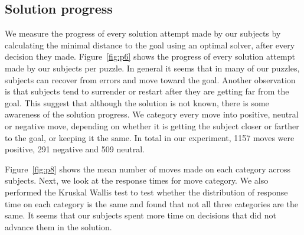 \documentclass[10pt,letterpaper]{article}
\begin{document}
\subsection{Solution progress}

We measure the progress of every solution attempt made by our subjects by calculating the minimal distance to the goal using an optimal solver, after every decision they made.  Figure~\ref{fig:p6} shows the progress of every solution attempt made by our subjects per puzzle. In general it seems that in many of our puzzles, subjects can recover from errors and move toward the goal. 
Another observation is that subjects tend to surrender or restart after they are getting far from the goal. This suggest that although the solution is not known, there is some awareness of the solution progress.
We category every move into positive, neutral or negative move, depending on whether it is getting the subject closer or farther to the goal, or keeping it the same. 
In total in our experiment, 1157 moves were positive, 291 negative and 509 neutral.

Figure~\ref{fig:p8} shows the mean number of moves made on each category across subjects.  Next, we look at the response times for move category.  
We also performed the Kruskal Wallis test to test whether the distribution of response time on each category is the same and found that not all three categories are the same.
It seems that our subjects spent more time on decisions that did not advance them in the solution.
\end{document}
